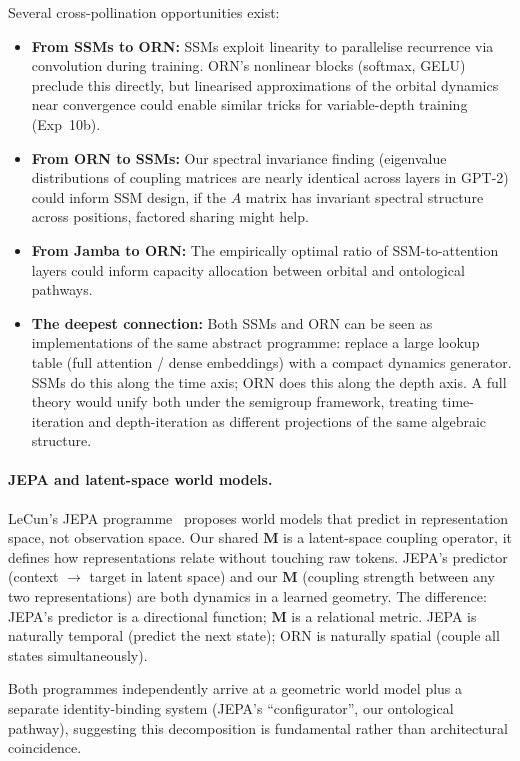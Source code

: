 \documentclass[11pt, a4paper]{article}
\newcommand{\M}{\mathbf{M}}
\theoremstyle{remark}
\begin{document}
Several cross-pollination opportunities exist:
\begin{itemize}[nosep]
    \item \textbf{From SSMs to ORN:} SSMs exploit linearity to parallelise recurrence via convolution during training. ORN's nonlinear blocks (softmax, GELU) preclude this directly, but linearised approximations of the orbital dynamics near convergence could enable similar tricks for variable-depth training (Exp~10b).
    \item \textbf{From ORN to SSMs:} Our spectral invariance finding (eigenvalue distributions of coupling matrices are nearly identical across layers in GPT-2) could inform SSM design, if the $A$ matrix has invariant spectral structure across positions, factored sharing might help.
    \item \textbf{From Jamba to ORN:} The empirically optimal ratio of SSM-to-attention layers could inform capacity allocation between orbital and ontological pathways.
    \item \textbf{The deepest connection:} Both SSMs and ORN can be seen as implementations of the same abstract programme: replace a large lookup table (full attention / dense embeddings) with a compact dynamics generator. SSMs do this along the time axis; ORN does this along the depth axis. A full theory would unify both under the semigroup framework, treating time-iteration and depth-iteration as different projections of the same algebraic structure.
\end{itemize}

\paragraph{JEPA and latent-space world models.}
LeCun's JEPA programme~\cite{lecun2022jepa} proposes world models that predict in representation space, not observation space.
Our shared $\M$ is a latent-space coupling operator, it defines how representations relate without touching raw tokens.
JEPA's predictor (context $\to$ target in latent space) and our $\M$ (coupling strength between any two representations) are both dynamics in a learned geometry.
The difference: JEPA's predictor is a directional function; $\M$ is a relational metric.
JEPA is naturally temporal (predict the next state); ORN is naturally spatial (couple all states simultaneously).

Both programmes independently arrive at a geometric world model plus a separate identity-binding system (JEPA's ``configurator'', our ontological pathway), suggesting this decomposition is fundamental rather than architectural coincidence.
\end{document}

